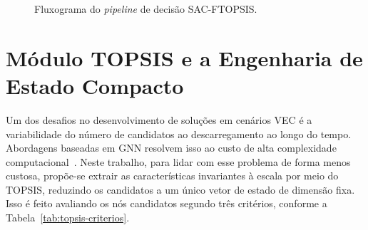 \begin{figure}[htb]
{%
}
\caption{Fluxograma do \textit{pipeline} de decisão \gls{SAC}-FTOPSIS.}
\label{fig:pipeline-sac-ftopsis}
\end{figure}


\section*{Módulo \texorpdfstring{\gls{TOPSIS}}{\gls{TOPSIS}} e a Engenharia de Estado Compacto}

Um dos desafios no desenvolvimento de soluções em cenários \gls{VEC} é a variabilidade do número de candidatos ao descarregamento ao longo do tempo. Abordagens baseadas em \gls{GNN} resolvem isso ao custo de alta complexidade computacional~\cite{miriyala2026}. Neste trabalho, para lidar com esse problema de forma menos custosa, propõe-se extrair as características invariantes à escala por meio do \gls{TOPSIS}, reduzindo os candidatos a um único vetor de estado de dimensão fixa. Isso é feito avaliando os nós candidatos segundo três critérios, conforme a Tabela~\ref{tab:topsis-criterios}.

